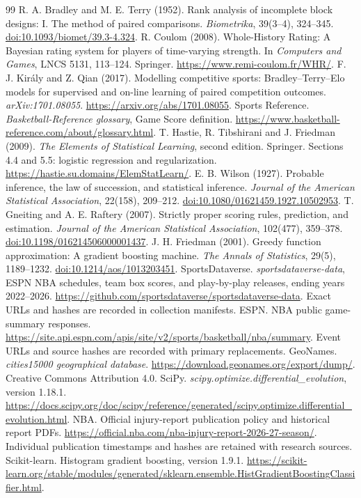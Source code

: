 \documentclass[11pt]{article}
\begin{document}
\clearpage
\begin{thebibliography}{99}
R. A. Bradley and M. E. Terry (1952).
Rank analysis of incomplete block designs: I. The method of paired comparisons.
\emph{Biometrika}, 39(3--4), 324--345.
\href{https://doi.org/10.1093/biomet/39.3-4.324}{doi:10.1093/biomet/39.3-4.324}.
R. Coulom (2008). Whole-History Rating: A Bayesian rating system for players
of time-varying strength. In \emph{Computers and Games}, LNCS 5131,
113--124. Springer. \url{https://www.remi-coulom.fr/WHR/}.
F. J. Kir\'aly and Z. Qian (2017). Modelling competitive sports:
Bradley--Terry--Elo models for supervised and on-line learning of paired
competition outcomes. \emph{arXiv:1701.08055}.
\url{https://arxiv.org/abs/1701.08055}.
Sports Reference. \emph{Basketball-Reference glossary}, Game Score definition.
\url{https://www.basketball-reference.com/about/glossary.html}.
T. Hastie, R. Tibshirani and J. Friedman (2009).
\emph{The Elements of Statistical Learning}, second edition. Springer.
Sections 4.4 and 5.5: logistic regression and regularization.
\url{https://hastie.su.domains/ElemStatLearn/}.
E. B. Wilson (1927). Probable inference, the law of succession, and statistical inference.
\emph{Journal of the American Statistical Association}, 22(158), 209--212.
\href{https://doi.org/10.1080/01621459.1927.10502953}{doi:10.1080/01621459.1927.10502953}.
T. Gneiting and A. E. Raftery (2007).
Strictly proper scoring rules, prediction, and estimation.
\emph{Journal of the American Statistical Association}, 102(477), 359--378.
\href{https://doi.org/10.1198/016214506000001437}{doi:10.1198/016214506000001437}.
J. H. Friedman (2001). Greedy function approximation: A gradient boosting machine.
\emph{The Annals of Statistics}, 29(5), 1189--1232.
\href{https://doi.org/10.1214/aos/1013203451}{doi:10.1214/aos/1013203451}.
SportsDataverse. \emph{sportsdataverse-data}, ESPN NBA schedules, team box scores,
and play-by-play releases, ending years 2022--2026.
\url{https://github.com/sportsdataverse/sportsdataverse-data}.
Exact URLs and hashes are recorded in collection manifests.
ESPN. NBA public game-summary responses.
\url{https://site.api.espn.com/apis/site/v2/sports/basketball/nba/summary}.
Event URLs and source hashes are recorded with primary replacements.
GeoNames. \emph{cities15000 geographical database}.
\url{https://download.geonames.org/export/dump/}.
Creative Commons Attribution 4.0.
SciPy. \emph{scipy.optimize.differential\_evolution}, version 1.18.1.
\url{https://docs.scipy.org/doc/scipy/reference/generated/scipy.optimize.differential_evolution.html}.
NBA. Official injury-report publication policy and historical report PDFs.
\url{https://official.nba.com/nba-injury-report-2026-27-season/}.
Individual publication timestamps and hashes are retained with research sources.
Scikit-learn. Histogram gradient boosting, version 1.9.1.
\url{https://scikit-learn.org/stable/modules/generated/sklearn.ensemble.HistGradientBoostingClassifier.html}.
\end{thebibliography}
\end{document}
